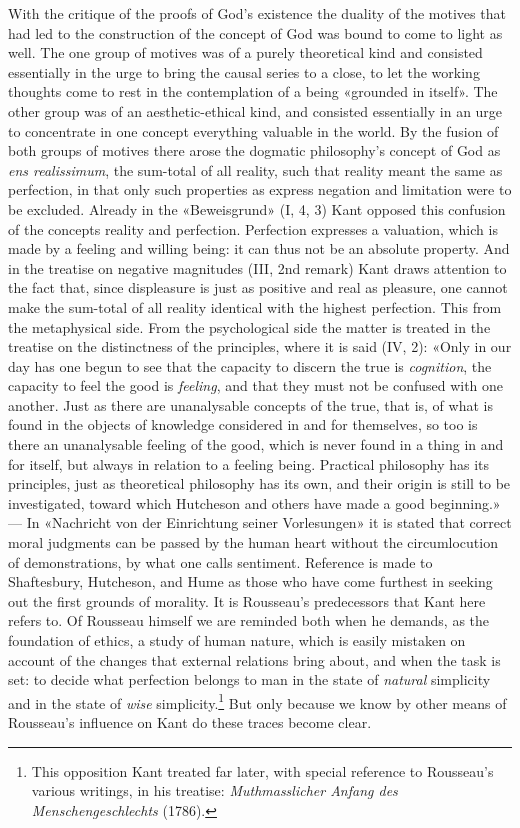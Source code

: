 \documentclass[12pt,a4paper]{article}
\newcommand{\opage}[1]{\marginnote{\footnotesize\textit{[#1]}}}
\begin{document}
With the critique of the proofs of God's existence the duality of the
motives that had led to the construction of the concept of God was bound to
come to light as well. The one group of motives was of a purely theoretical
kind and consisted essentially in the urge to bring the causal series to a
close, to let the working thoughts come to rest in the contemplation of a
being «grounded in itself». The other group was of an aesthetic-ethical
kind, and consisted essentially in an urge to concentrate in one concept
everything valuable in the world. By the fusion of both groups of motives
there arose the dogmatic philosophy's concept of God as \textit{ens
realissimum}, the sum-total of all reality, such that reality meant the
same as perfection, in that only such properties as express negation and
limitation were to be excluded. Already in the «Beweisgrund» (I, 4, 3) Kant
opposed this confusion of the concepts reality and perfection. Perfection
expresses a valuation, which is made by a feeling and willing being: it can
thus not be an absolute property. And in the treatise on negative
magnitudes (III, 2nd remark) Kant draws attention to the fact that, since
displeasure is just as positive and real as pleasure, one cannot make the
sum-total of all reality identical with the highest perfection. This from
the metaphysical side. From the psychological side the matter is treated in
the treatise on the distinctness of the principles, where it is said (IV,
2): «Only in our day has one begun to see that the capacity to discern the
true is \emph{cognition}, the capacity to feel the good is \emph{feeling}, and that they
must not be confused with one another. Just as there are unanalysable
concepts of the true, that is, of what is found in the objects of knowledge
\opage{38}considered in and for themselves, so too is there an unanalysable feeling
of the good, which is never found in a thing in and for itself, but always
in relation to a feeling being. Practical philosophy has its principles,
just as theoretical philosophy has its own, and their origin is still to be
investigated, toward which Hutcheson and others have made a good
beginning.» --- In «Nachricht von der Einrichtung seiner Vorlesungen» it is
stated that correct moral judgments can be passed by the human heart
without the circumlocution of demonstrations, by what one calls sentiment.
Reference is made to Shaftesbury, Hutcheson, and Hume as those who have come
furthest in seeking out the first grounds of morality. It is Rousseau's
predecessors that Kant here refers to. Of Rousseau himself we are reminded
both when he demands, as the foundation of ethics, a study of human nature,
which is easily mistaken on account of the changes that external relations
bring about, and when the task is set: to decide what perfection belongs to
man in the state of \emph{natural} simplicity and in the state of \emph{wise}
simplicity.\footnote{This opposition Kant treated far later, with special
reference to Rousseau's various writings, in his treatise: \textit{Muthmasslicher
Anfang des Menschengeschlechts} (1786).} But only because we know by other
means of Rousseau's influence on Kant do these traces become clear.
\end{document}

